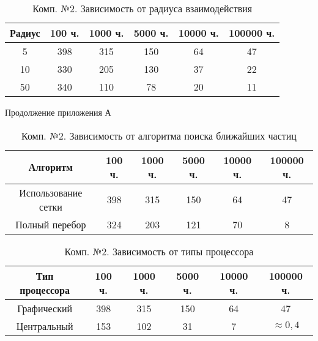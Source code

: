 \begin{table}[h!]
  \captionsetup{width=0.7\textwidth}
  \caption{\label{tab:snd:radius}Комп. №2. Зависимость от радиуса взаимодействия}
  \begin{center}
    \begin{tabular}{|c|c|c|c|c|c|}
      \hline
      Радиус & 100 ч. & 1000 ч. & 5000 ч. & 10000 ч. & 100000 ч. \\
      \hline
      5 & 398 & 315 & 150 & 64 & 47 \\
      10 & 330 & 205 & 130 & 37 & 22 \\
      50 & 340 & 110 & 78 & 20 & 11 \\
      \hline
    \end{tabular}
  \end{center}
\end{table}

\newpage
\begin{flushright}
  Продолжение приложения А
\end{flushright}


\begin{table}[h!]
  \captionsetup{width=0.9\textwidth}
  \caption{\label{tab:snd:algorithm}Комп. №2. Зависимость от алгоритма поиска ближайших частиц}
  \begin{center}
    \begin{tabular}{|c|c|c|c|c|c|}
      \hline
      Алгоритм & 100 ч. & 1000 ч. & 5000 ч. & 10000 ч. & 100000 ч. \\
      \hline
      Использование сетки & 398 & 315 & 150 & 64 & 47 \\
      Полный перебор & 324 & 203 & 121 & 70 & 8 \\
      \hline
    \end{tabular}
  \end{center}
\end{table}

\begin{table}[h!]
  \captionsetup{width=0.8\textwidth}
  \caption{\label{tab:snd:cpu}Комп. №2. Зависимость от типы процессора}
  \begin{center}
    \begin{tabular}{|c|c|c|c|c|c|}
      \hline
      Тип процессора & 100 ч. & 1000 ч. & 5000 ч. & 10000 ч. & 100000 ч. \\
      \hline
      Графический & 398 & 315 & 150 & 64 & 47 \\
      Центральный & 153 & 102 & 31 & 7 & $\approx{}0,4$ \\
      \hline
    \end{tabular}
  \end{center}
\end{table}

